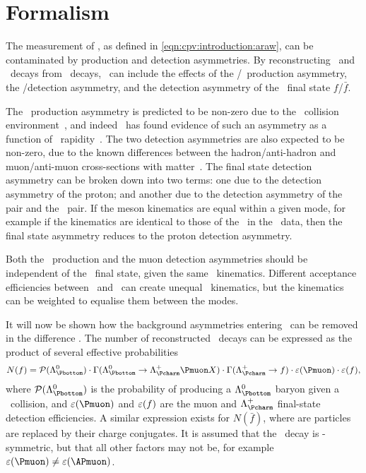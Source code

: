 \chapter{Formalism}
\label{chap:cpv:theory}

The measurement of \ARaw, as defined in \cref{eqn:cpv:introduction:araw}, can
be contaminated by production and detection asymmetries.
By reconstructing \LcTopKK\ and \LcToppipi\ decays from
\ decays, \ARaw\ can include the effects of
the \PLambdab/\APLambdab\ production asymmetry, the \Pmuon/\APmuon detection
asymmetry, and the detection asymmetry of the \PLambdac\ final state
$f$/$\bar{f}$.

The \PLambdab\ production asymmetry is predicted to be non-zero due to the \pp\
collision environment~\cite{PhysRevD.90.014023}, and indeed \lhcb\ has found
evidence of such an asymmetry as a function of \PLambdab\
rapidity~\cite{Aaij:2015fea}.
The two detection asymmetries are also expected to be non-zero, due to the
known differences between the hadron/anti-hadron and muon/anti-muon
cross-sections with matter~\cite{PDG2014}.
The final state detection asymmetry can be broken down into two terms: one due
to the detection asymmetry of the proton; and another due to the detection
asymmetry of the \KmKp pair and the \pimpip\ pair.
If the meson kinematics are equal within a given mode, for example if the
\PKminus kinematics are identical to those of the \PKplus\ in the \pKK\ data,
then the final state asymmetry reduces to the proton detection asymmetry.

Both the \PLambdab\ production and the muon detection asymmetries should be
independent of the \PLambdac\ final state, given the same \PLambdac\
kinematics.
Different acceptance efficiencies between \pKK\ and \ppipi\ can create unequal
\PLambdac\ kinematics, but the kinematics can be weighted to equalise them
between the modes.

It will now be shown how the background asymmetries entering \ARaw\ can be
removed in the difference \dACP\@.
The number of reconstructed \LcTof\ decays can be expressed as the product of
several effective probabilities
\begin{equation}
  N(f) = \prob(\PLambdab)\cdot
         \Gamma(\LbToLcmuX)\cdot
         \Gamma(\LcTof)\cdot
         \eff(\Pmuon)\cdot
         \eff(f),
  \label{eqn:cpv:theory:yield}
\end{equation}
where $\prob(\PLambdab)$ is the probability of producing a $\PLambdab$ baryon
given a \pp\ collision, and $\eff(\Pmuon)$ and $\varepsilon(f)$ are the muon and
$\PLambdac$ final-state detection efficiencies.
A similar expression exists for $N(\bar{f})$, where are particles are replaced
by their charge conjugates.
It is assumed that the \LbToLcmuX\ decay is \CP-symmetric, but that all other
factors may not be, for example $\eff(\Pmuon) \neq \eff(\APmuon)$.

